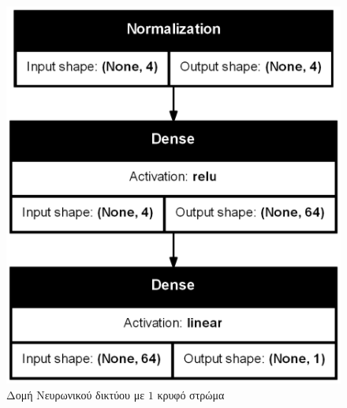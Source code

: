 \begin{figure}[H]
  \centering
  \begin{minipage}{0.4\textwidth}
      \centering
      \includegraphics[width=\linewidth]{images/Results/Neural Net/1HL/structure.png}
      \caption{Δομή Νευρωνικού δικτύου με $1$ κρυφό στρώμα}
      \label{fig:Neural Network Structure with 1 Hidden layer}
  \end{minipage}
  \hfill
  \begin{minipage}{0.4\textwidth}
      \centering

\end{minipage}
\end{figure}
